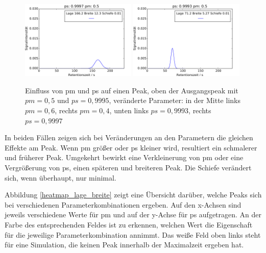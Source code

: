 \begin{figure}[h]
\includegraphics[width=0.49\textwidth]{bilder/2s_einzeleinfluss/2s_t100_psp}
\includegraphics[width=0.49\textwidth]{bilder/2s_einzeleinfluss/2s_t100_psm}
\caption[Einfluss von pm und ps auf einen Peak]{Einfluss von pm und ps auf einen Peak, oben der Ausgangspeak mit $pm = 0,5$ und $ps = 0,9995$, veränderte Parameter: in der Mitte links $pm = 0,6$, rechts $pm = 0,4$, unten links $ps = 0,9993$, rechts $ps = 0,9997$ }
\label{2s_t100_change}
\end{figure}

In beiden Fällen zeigen sich bei Veränderungen an den Parametern die gleichen Effekte am Peak. Wenn pm größer oder ps kleiner wird, resultiert ein schmalerer und früherer Peak. Umgekehrt bewirkt eine Verkleinerung von pm oder eine Vergrößerung von ps, einen späteren und breiteren Peak. Die Schiefe verändert sich, wenn überhaupt, nur minimal.

Abbildung \ref{heatmap_lage_breite} zeigt eine Übersicht darüber, welche Peaks sich bei verschiedenen Parameterkombinationen ergeben. Auf den x-Achsen sind jeweils verschiedene Werte für pm und auf der y-Achse für ps aufgetragen. An der Farbe des entsprechenden Feldes ist zu erkennen, welchen Wert die Eigenschaft für die jeweilige Parameterkombination annimmt. Das weiße Feld oben links steht für eine Simulation, die keinen Peak innerhalb der Maximalzeit ergeben hat.

